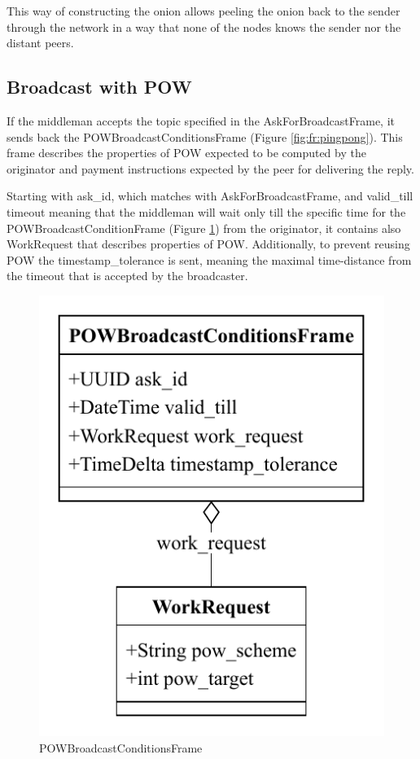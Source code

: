 \documentclass{article}
\begin{document}
This way of constructing the onion allows peeling the onion back to the sender through the network in a way that none of the nodes knows the sender nor the distant peers.

\subsection{Broadcast with POW} 

If the middleman accepts the topic specified in the AskForBroadcastFrame, it sends back the POWBroadcastConditionsFrame (Figure \ref{fig:fr:pingpong}). This frame describes the properties of POW expected to be computed by the originator and payment instructions expected by the peer for delivering the reply.

Starting with ask\_id, which matches with AskForBroadcastFrame, and valid\_till timeout meaning that the middleman will wait only till the specific time for the POWBroadcastConditionFrame (Figure \ref{fig:fr:powbroadcastcondition}) from the originator, it contains also WorkRequest that describes properties of POW. Additionally, to prevent reusing POW the timestamp\_tolerance is sent, meaning the maximal time-distance from the timeout that is accepted by the broadcaster.

\begin{figure}
	\centering
	\includegraphics[scale=0.7]{POWBroadcastCondition.pdf}
	\caption{POWBroadcastConditionsFrame}
	\label{fig:fr:powbroadcastcondition}
\end{figure}
\end{document}
